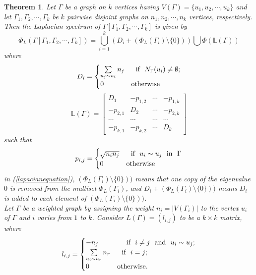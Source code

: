 \documentclass{amsart}
\theoremstyle{plain}
\newtheorem{theorem}{Theorem}[section]
\theoremstyle{definition}
\theoremstyle{remark}
\begin{document}
\begin{theorem}\cite{cardoso2013spectra}\label{laplacianspectrum theoremforjoin}
Let $\Gamma$ be a graph on $k$ vertices having $V(\Gamma) = \{u_1, u_2, \cdots, u_k\}$ and let $\Gamma_1, \Gamma_2, \cdots, \Gamma_k$ be $k$ pairwise disjoint graphs on $n_1, n_2, \cdots, n_k$ vertices, respectively. Then the Laplacian spectrum of $\Gamma[\Gamma_1, \Gamma_2, \cdots, \Gamma_k]$ is given by
\begin{equation}\label{lapacianequation}
\Phi_{L}(\Gamma[\Gamma_1, \Gamma_2, \cdots, \Gamma_k]) = \bigcup\limits_{i=1}^{k} (D_{i} + (\Phi_{L}(\Gamma_i) \setminus \{0\})) \bigcup \Phi(\mathbb{L}(\Gamma))
    \end{equation}
where \[ D_i = \begin{cases} 
      \sum \limits_{u_j \sim u_i}n_j & ~~\text{if}~~ N_{\Gamma}(u_i) \neq \emptyset;\\
      0 & \rm{otherwise} 
    \end{cases}
\]
\begin{equation}
\mathbb{L}({\Gamma})  = \displaystyle \begin{bmatrix}
	D_{1}&  -p_{1,2} & \cdots & -p_{1,k}  \\
	-p_{2,1}& D_{2}   &\cdots&  -p_{2,k} \\ 
 \cdots & \cdots & \cdots & \cdots \\
 -p_{k,1} & -p_{k,2} & \cdots & D_{k}
	\end{bmatrix}
\end{equation}
such that \[ p_{i,j} = \begin{cases} 
      \sqrt{n_in_j} & ~~\text{if}~~ u_i \sim u_j~~ \text{in}~~ \Gamma\\
      0 & \rm{otherwise} 
    \end{cases}
\]
in (\ref{lapacianequation}), $(\Phi_{L}(\Gamma_i) \setminus \{0\}))$ means that one copy of the eigenvalue $0$ is removed from the multiset $\Phi_{L}(\Gamma_i)$, and $D_i+(\Phi_{L}(\Gamma_i) \setminus \{0\}))$ means $D_i$ is added to each element of $(\Phi_{L}(\Gamma_i) \setminus \{0\}))$.\\

Let $\Gamma$ be a weighted graph by assigning the weight $n_i = |V(\Gamma_i)|$ to the vertex $u_i$ of $\Gamma$ and $i$ varies from $1$ to $k$. Consider $L(\Gamma)= (l_{i,j})$ to be a $k \times k$ matrix, where 
\[ l_{i,j} = \begin{cases}
      -n_j &~~~~\text{if} ~~i \neq j ~~\text{and}~~u_i \sim u_j;\\
      \sum \limits_{u_i \sim u_r}n_r & ~~\text{if}~~ i=j;\\
      0 & \rm{otherwise.} 
    \end{cases}
\]
\end{theorem}
\end{document}
